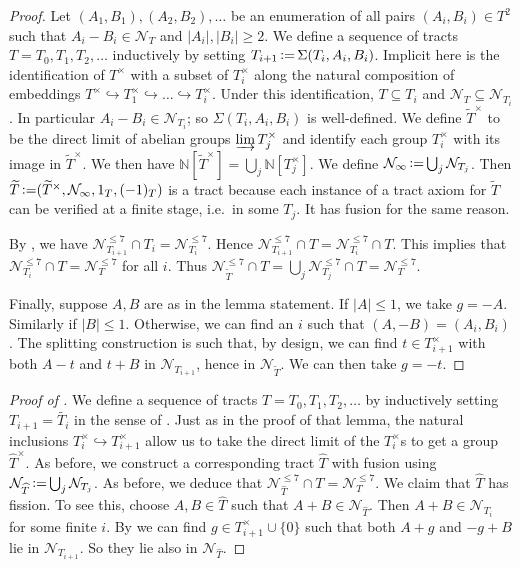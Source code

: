\documentclass[reqno]{amsart}
\theoremstyle{definition}
\theoremstyle{remark}
\newcommand{\abs}[1]{\lvert #1 \rvert}
\newcommand{\Nc}{\mathcal{N}}
\DeclareMathOperator{\deq}{\vcentcolon=}
\begin{document}
\begin{proof}
    Let $(A_1, B_1), (A_2, B_2), \dots$ be an enumeration of all pairs $(A_i, B_i) \in T^2$ such that $A_i - B_i \in \Nc_T$ and $\abs{A_i}, \abs{B_i} \geq 2$. We define a sequence of tracts $T = T_0, T_1, T_2, \dots$ inductively by setting $T_{i+1} \deq \Sigma(T_i, A_i, B_i)$. Implicit here is the identification of $T^{\times}$ with a subset of $T_i^{\times}$ along the natural composition of embeddings 
    $T^{\times} \hookrightarrow T_1^{\times} \hookrightarrow \dots \hookrightarrow T_i^{\times}$. Under this identification,
    $T \subseteq T_i$ and
    $\Nc_T \subseteq \Nc_{T_i}$. In particular $A_i - B_i \in \Nc_{T_i}$; so $\Sigma(T_i, A_i, B_i)$ is well-defined. We define $\widetilde{T}^{\times}$ to be the direct limit of abelian groups $\varinjlim T_j^{\times}$ and identify each group $T_i^{\times}$ with its image in $\widetilde{T}^{\times}$. We then have 
    $\mathbb{N}[\widetilde{T}^{\times}] = \bigcup_{j} \mathbb{N}[T_j^{\times}]$. We define 
    $\Nc_{\infty} \deq \bigcup_{j} \Nc_{T_j}$.
    Then $\widetilde{T}\deq (\widetilde{T}^{\times}, \Nc_{\infty}, 1_T, (-1)_T)$ is a tract because each instance of a tract axiom for $\widetilde{T}$ can be verified at a finite stage, i.e.\ in some $T_j$.
    It has fusion for the same reason. 

    By , we have $\Nc_{T_{i+1}}^{\leq 7} \cap T_i = \Nc_{T_i}^{\leq 7}$. Hence $\Nc_{T_{i+1}}^{\leq 7} \cap T = \Nc_{T_i}^{\leq 7} \cap T$. This implies that
    $\Nc_{T_i}^{\leq 7} \cap T = \Nc_{T}^{\leq 7}$ for all $i$. Thus $\Nc_{\widetilde{T}}^{\leq7} \cap T = \bigcup_{j} \Nc_{T_j}^{\leq 7} \cap T = \Nc_T^{\leq 7}$.

    Finally, suppose  $A, B$ are as in the lemma statement. 
    If $\abs{A} \leq 1$, we take $g = -A$.
    Similarly if $\abs{B} \leq 1$. Otherwise, 
    we can find an $i$ such that $(A, -B) = (A_i, B_i)$.
    The splitting construction is such that, by design, we can find $t \in T_{i+1}^{\times}$ with both $A - t$ and $t + B$ in $\Nc_{T_{i+1}}$, hence in $\Nc_{\widetilde{T}}$. We can then take $g = -t$.
\end{proof}

\begin{proof}[Proof of ]
    We define a sequence of tracts $T = T_0, T_1, T_2, \dots$ by inductively setting $T_{i+1} = \widetilde{T_i}$ in the sense of . Just as in the proof of that lemma, the natural inclusions $T_i^{\times} \hookrightarrow T_{i+1}^{\times}$ allow us to take the direct limit of the $T_i^{\times}$s to get a group $\widehat{T}^{\times}$. As before, we construct a corresponding tract 
    $\widehat{T}$ with fusion using 
    $\Nc_{\widehat{T}} \deq \bigcup_j \Nc_{T_j}$. As before, we deduce that $\Nc_{\widehat{T}}^{\leq 7} \cap T = \Nc_{T}^{\leq 7}$.
    We claim that $\widehat T$ has fission. To see this, choose $A, B\in \widehat{T}$ such that $A + B \in \Nc_{\widehat{T}}$. Then 
    $A + B \in \Nc_{T_i}$ for some finite $i$. 
    By  we can find $g \in T_{i+1}^{\times} \cup \{0\}$ such that both $A + g$ and $-g + B$ lie in $\Nc_{T_{i+1}}$. So they lie also in $\Nc_{\widehat{T}}$.
\end{proof}
\end{document}
